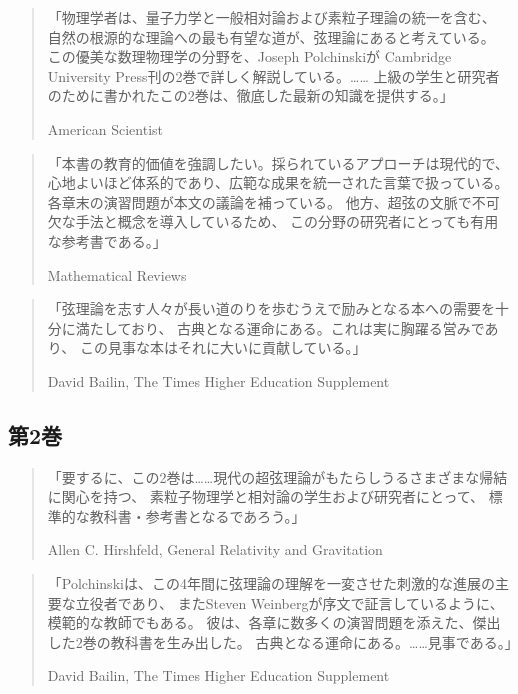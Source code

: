 \begin{quote}
「物理学者は、量子力学と一般相対論および素粒子理論の統一を含む、
自然の根源的な理論への最も有望な道が、弦理論にあると考えている。
この優美な数理物理学の分野を、Joseph Polchinskiが
Cambridge University Press刊の2巻で詳しく解説している。……
上級の学生と研究者のために書かれたこの2巻は、徹底した最新の知識を提供する。」
\begin{flushright}American Scientist\end{flushright}
\end{quote}

\begin{quote}
「本書の教育的価値を強調したい。採られているアプローチは現代的で、
心地よいほど体系的であり、広範な成果を統一された言葉で扱っている。
各章末の演習問題が本文の議論を補っている。
他方、超弦の文脈で不可欠な手法と概念を導入しているため、
この分野の研究者にとっても有用な参考書である。」
\begin{flushright}Mathematical Reviews\end{flushright}
\end{quote}

\begin{quote}
「弦理論を志す人々が長い道のりを歩むうえで励みとなる本への需要を十分に満たしており、
古典となる運命にある。これは実に胸躍る営みであり、
この見事な本はそれに大いに貢献している。」
\begin{flushright}David Bailin, The Times Higher Education Supplement\end{flushright}
\end{quote}

\subsection*{第2巻}
\begin{quote}
「要するに、この2巻は……現代の超弦理論がもたらしうるさまざまな帰結に関心を持つ、
素粒子物理学と相対論の学生および研究者にとって、
標準的な教科書・参考書となるであろう。」
\begin{flushright}Allen C. Hirshfeld, General Relativity and Gravitation\end{flushright}
\end{quote}

\begin{quote}
「Polchinskiは、この4年間に弦理論の理解を一変させた刺激的な進展の主要な立役者であり、
またSteven Weinbergが序文で証言しているように、模範的な教師でもある。
彼は、各章に数多くの演習問題を添えた、傑出した2巻の教科書を生み出した。
古典となる運命にある。……見事である。」
\begin{flushright}David Bailin, The Times Higher Education Supplement\end{flushright}
\end{quote}

